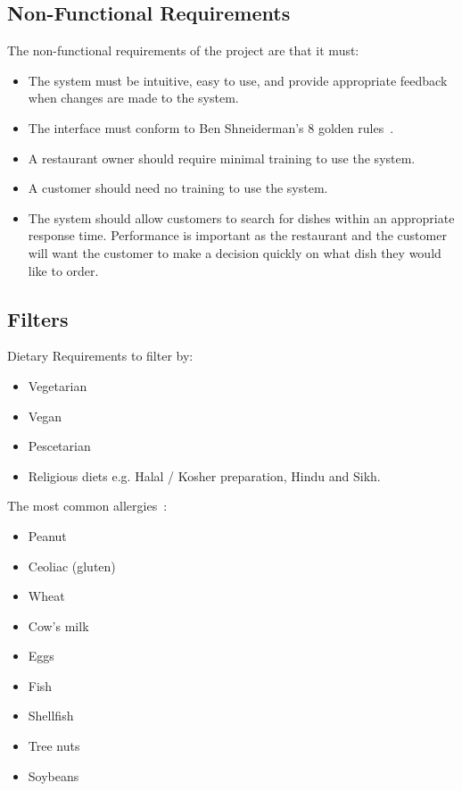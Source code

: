 \subsection{Non-Functional Requirements}

The non-functional requirements of the project are that it must:

\begin{itemize}
\item The system must be intuitive, easy to use, and provide appropriate feedback when changes are made to the system.
\item The interface must conform to Ben Shneiderman's 8 golden rules~\cite{shneiderman}.
\item A restaurant owner should require minimal training to use the system.
\item A customer should need no training to use the system.
\item The system should allow customers to search for dishes within an appropriate response time. Performance is important as the restaurant and the customer will want the customer to make a decision quickly on what dish they would like to order.
\end{itemize}

\subsection{Filters}

Dietary Requirements to filter by:

\begin{itemize}
\item Vegetarian
\item Vegan
\item Pescetarian
\item Religious diets e.g. Halal / Kosher preparation, Hindu and Sikh.
\end{itemize}

The most common allergies~\cite{burks2001food}:

\begin{itemize}
\item Peanut
\item Ceoliac (gluten)
\item Wheat
\item Cow's milk
\item Eggs
\item Fish
\item Shellfish
\item Tree nuts
\item Soybeans
\end{itemize}

